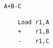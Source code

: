 \documentclass{jarticle}
\begin{document}
\verb|A+B-C|

  \begin{Verbatim}
    Load r1,A
    +    r1,B
    -    r1,C
    \end{Verbatim}
\end{document}

